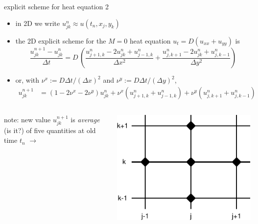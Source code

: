 \begin{frame}{explicit scheme for heat equation 2}

\begin{itemize}
\item in 2D we write $u_{jk}^n \approx u(t_n,x_j,y_k)$
\item the 2D explicit scheme for the $M=0$ heat equation $u_t = D(u_{xx} + u_{yy})$ is
\small
	$$\frac{u_{jk}^{n+1} - u_{jk}^n}{\Delta t} = D\,\left(\frac{u_{j+1,k}^n - 2 u_{jk}^n + u_{j-1,k}^n}{\Delta x^2} + \frac{u_{j,k+1}^n - 2 u_{jk}^n + u_{j,k-1}^n}{\Delta y^2}\right)$$
\normalsize
\item or, with $\nu^x := D \Delta t / (\Delta x)^2$ and $\nu^y := D \Delta t / (\Delta y)^2$,
\small
\begin{align*}
u_{jk}^{n+1} &= (1 - 2 \nu^x - 2 \nu^y) u_{jk}^n + \nu^x \left(u_{j+1,k}^n + u_{j-1,k}^n\right) + \nu^y \left(u_{j,k+1}^n + u_{j,k-1}^n\right)
\end{align*}
\end{itemize}

\begin{columns}[b]
\begin{column}{0.62\textwidth}
note: new value $u_{jk}^{n+1}$ is \emph{average} (is it?) of five quantities at old time $t_n$ \qquad $\longrightarrow$
\end{column}
\begin{column}{0.38\textwidth}
\includegraphics[width=1.1\textwidth]{photos/exp2dstencil}
\end{column}
\end{columns}
\end{frame}


